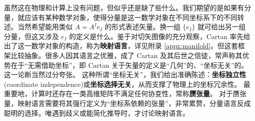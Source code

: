 虽然这在物理和计算上没有问题，但似乎还是缺了些什么。我们期望的是如果有分量，就应该有某种数学对象，使得分量是这一数学对象在不同坐标系下的不同转述。当然希望能用类似 $A=A^I e_I$ 的形式表述矢量。换一组 $\{e_I\}$ 就可给出另一组分量，但这又涉及 $e_I$ 的定义是什么。鉴于对切矢图像的充分观察，Cartan 率先给出了这一数学对象的构造，称为\textbf{映射语言}，详见附录 \ref{appx:manifold}。但这套框架比较抽象。很多人因其语言之优雅，成了 Cartan 及其后世之信徒，常声称其优势在于“无需借助坐标”，即 Cartan 关于矢量的定义是“几何”的、“坐标无关”的。这一论断当然过分夸张。
这种所谓“坐标无关”，我们给出准确陈述：\textbf{坐标独立性}(coordinate independence)或\textbf{坐标选择无关}，从而支撑了物理上的坐标冗余性。
最重要地，计算时还存在一类高维矩阵不满足任何协变性，常称\textbf{赝张量}。
对于赝张量，映射语言需要将其强行定义为“坐标系依赖的张量”，非常累赘，分量语言反成聪明的选择。唯遇到歧义或能简化推导时，才讨论映射语言。


